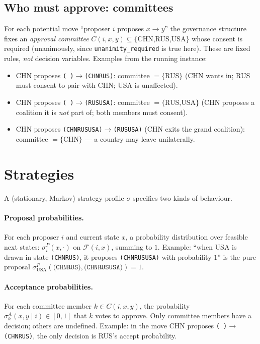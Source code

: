\documentclass[11pt]{article}
\newcommand{\state}[1]{\texttt{(#1)}}
\newcommand{\empt}{\texttt{(\,)}}
\begin{document}
\subsection{Who must approve: committees}
\label{sec:committees}
For each potential move ``proposer $i$ proposes $x\to y$'' the governance structure
fixes an \emph{approval committee} $C(i,x,y)\subseteq\{$CHN,RUS,USA$\}$ whose consent
is required (unanimously, since \texttt{unanimity\_required} is true here). These are
fixed rules, \emph{not} decision variables. Examples from the running instance:
\begin{itemize}[nosep]
\item CHN proposes \empt$\to$\state{CHNRUS}: committee $=\{$RUS$\}$ (CHN wants in; RUS
must consent to pair with CHN; USA is unaffected).
\item CHN proposes \empt$\to$\state{RUSUSA}: committee $=\{$RUS,USA$\}$ (CHN proposes
a coalition it is \emph{not} part of; both members must consent).
\item CHN proposes \state{CHNRUSUSA}$\to$\state{RUSUSA} (CHN exits the grand
coalition): committee $=\{$CHN$\}$ --- a country may leave unilaterally.
\end{itemize}

\section{Strategies}
\label{sec:strategies}
A (stationary, Markov) strategy profile $\sigma$ specifies two kinds of behaviour.

\paragraph{Proposal probabilities.} For each proposer $i$ and current state $x$, a
probability distribution over feasible next states:
$\sigma^P_i(x,\cdot)$ on $\mathcal{F}(i,x)$, summing to $1$. Example: ``when USA is
drawn in state \state{CHNRUS}, it proposes \state{CHNRUSUSA} with probability $1$''
is the pure proposal $\sigma^P_{\text{USA}}(\state{CHNRUS},\state{CHNRUSUSA})=1$.

\paragraph{Acceptance probabilities.} For each committee member $k\in C(i,x,y)$, the
probability $\sigma^A_k(x,y\mid i)\in[0,1]$ that $k$ votes to approve. Only committee
members have a decision; others are undefined. Example: in the move
CHN proposes \empt$\to$\state{CHNRUS}, the only decision is RUS's accept probability.
\end{document}
